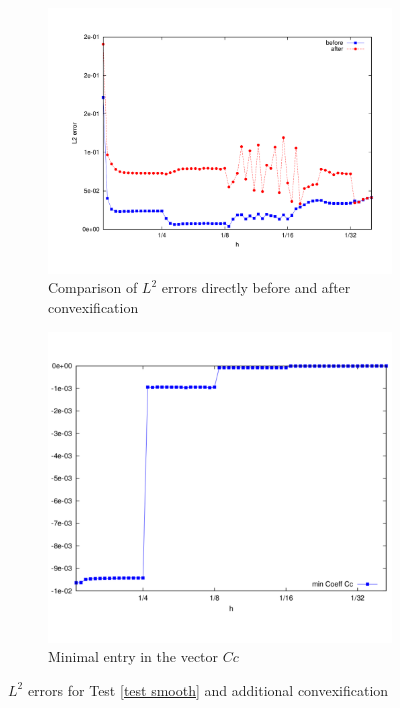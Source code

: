 \begin{figure}[H]
\centering
	\begin{subfigure}{0.45\textwidth}
		\centering
		\includegraphics[scale=0.25]{plots/MA1_convexComp.pdf}
		\caption{Comparison of $L^2$ errors directly before and after convexification}
		\label{fig: convex before after}
	\end{subfigure}
	\begin{subfigure}{0.45\textwidth}
		\centering
		\includegraphics[scale=0.25]{plots/MA1_minCoeff.pdf}
		\caption{Minimal entry in the vector $C c$}
		\label{fig: convex min coeffs}
	\end{subfigure}	
	\caption{$L^2$ errors for Test \ref{test smooth} and additional convexification}
	\label{fig: Compare test smooth ourMethodConvex}
\end{figure}


